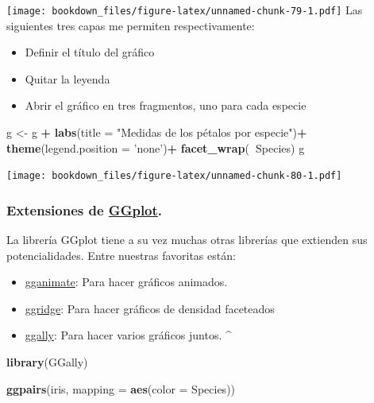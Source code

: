 \documentclass[]{book}
\newenvironment{Shaded}{\begin{snugshade}}{\end{snugshade}}
\newcommand{\DataTypeTok}[1]{\textcolor[rgb]{0.13,0.29,0.53}{#1}}
\newcommand{\KeywordTok}[1]{\textcolor[rgb]{0.13,0.29,0.53}{\textbf{#1}}}
\newcommand{\NormalTok}[1]{#1}
\newcommand{\OperatorTok}[1]{\textcolor[rgb]{0.81,0.36,0.00}{\textbf{#1}}}
\newcommand{\StringTok}[1]{\textcolor[rgb]{0.31,0.60,0.02}{#1}}
\providecommand{\tightlist}{%
  \setlength{\itemsep}{0pt}\setlength{\parskip}{0pt}}
\begin{document}
\texttt{[image: bookdown\_files/figure-latex/unnamed-chunk-79-1.pdf]}
Las siguientes tres capas me permiten respectivamente:

\begin{itemize}
\tightlist
\item
  Definir el título del gráfico
\item
  Quitar la leyenda
\item
  Abrir el gráfico en tres fragmentos, uno para cada especie
\end{itemize}

\begin{Shaded}
\begin{Highlighting}[]
\NormalTok{g <-}\StringTok{ }\NormalTok{g }\OperatorTok{+}
\StringTok{  }\KeywordTok{labs}\NormalTok{(}\DataTypeTok{title =} \StringTok{"Medidas de los pétalos por especie"}\NormalTok{)}\OperatorTok{+}
\StringTok{  }\KeywordTok{theme}\NormalTok{(}\DataTypeTok{legend.position =} \StringTok{'none'}\NormalTok{)}\OperatorTok{+}
\StringTok{  }\KeywordTok{facet_wrap}\NormalTok{(}\OperatorTok{~}\NormalTok{Species)}
\NormalTok{g}
\end{Highlighting}
\end{Shaded}

\texttt{[image: bookdown\_files/figure-latex/unnamed-chunk-80-1.pdf]}

\hypertarget{extensiones-de-ggplot.}{%
\subsubsection{\texorpdfstring{Extensiones de \href{http://www.ggplot2-exts.org/gallery/}{GGplot}.}{Extensiones de GGplot.}}\label{extensiones-de-ggplot.}}

La librería GGplot tiene a su vez muchas otras librerías que extienden sus potencialidades. Entre nuestras favoritas están:

\begin{itemize}
\tightlist
\item
  \href{https://gganimate.com/}{gganimate}: Para hacer gráficos animados.
\item
  \href{https://cran.r-project.org/web/packages/ggridges/vignettes/introduction.html}{ggridge}: Para hacer gráficos de densidad faceteados
\item
  \href{https://ggobi.github.io/ggally/}{ggally}: Para hacer varios gráficos juntos.
  \^{}
\end{itemize}

\begin{Shaded}
\begin{Highlighting}[]
\KeywordTok{library}\NormalTok{(GGally)}

\KeywordTok{ggpairs}\NormalTok{(iris,  }\DataTypeTok{mapping =} \KeywordTok{aes}\NormalTok{(}\DataTypeTok{color =}\NormalTok{ Species))}
\end{Highlighting}
\end{Shaded}
\end{document}
